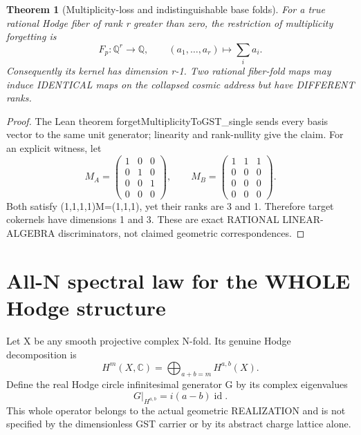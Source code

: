 \documentclass[11pt]{article}
\newtheorem{theorem}{Theorem}
\begin{document}
\begin{theorem}[Multiplicity-loss and indistinguishable base folds]
For a true rational Hodge fiber of rank r greater than zero,
the restriction of multiplicity forgetting is
\[
 F_p:\mathbb Q^r\longrightarrow\mathbb Q,\qquad
 (a_1,\ldots,a_r)\mapsto\sum_i a_i.
\]
Consequently its kernel has dimension r-1. Two rational
fiber-fold maps may induce IDENTICAL maps on the collapsed
cosmic address but have DIFFERENT ranks.
\end{theorem}
\begin{proof}
The Lean theorem forgetMultiplicityToGST_single sends every
basis vector to the same unit generator; linearity and
rank-nullity give the claim. For an explicit witness, let
\[
 M_A=\begin{pmatrix}
1&0&0\\0&1&0\\0&0&1\\0&0&0
\end{pmatrix},\qquad
 M_B=\begin{pmatrix}
1&1&1\\0&0&0\\0&0&0\\0&0&0
\end{pmatrix}.
\]
Both satisfy (1,1,1,1)M=(1,1,1), yet their ranks are
3 and 1. Therefore target cokernels have dimensions
1 and 3. These are exact RATIONAL LINEAR-ALGEBRA
discriminators, not claimed geometric correspondences.
\end{proof}

\section{All-N spectral law for the WHOLE Hodge structure}
Let X be any smooth projective complex N-fold. Its genuine
Hodge decomposition is
\[
 H^m(X,\mathbb C)=\bigoplus_{a+b=m}H^{a,b}(X).
\]
Define the real Hodge circle infinitesimal generator G
by its complex eigenvalues
\[
 \boxed{G|_{H^{a,b}}=i(a-b)\operatorname{id}.}       \tag{1}
\]
This whole operator belongs to the actual geometric
REALIZATION and is not specified by the dimensionless
GST carrier or by its abstract charge lattice alone.
\end{document}
